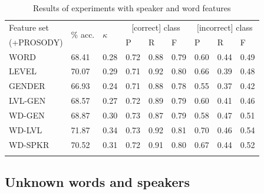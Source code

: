 		
		
		\begin{table}
			\centering
			\caption{Results of experiments with speaker and word features  }
			\begin{tabularx}{\textwidth}{lXXXXXXXX}			
			
			\toprule
			Feature set & 
			\multirow{2}{*}{\% acc.} & \multirow{2}{*}{$\kappa$} & \multicolumn{3}{c}{[correct] class} & \multicolumn{3}{c}{[incorrect] class} \\
			 \cmidrule(lr){4-6} \cmidrule(lr){7-9}
			 (+PROSODY)& & & P & R & F & P & R & F \\
			\midrule
WORD	&	68.41	&	0.28	&	0.72	&	0.88	&	0.79	&	0.60	&	0.44	&	0.49	\\
LEVEL	&	70.07	&	0.29	&	0.71	&	0.92	&	0.80	&	0.66	&	0.39	&	0.48	\\
GENDER	&	66.93	&	0.24	&	0.71	&	0.88	&	0.78	&	0.55	&	0.37	&	0.42	\\
\addlinespace
LVL-GEN	&	68.57	&	0.27	&	0.72	&	0.89	&	0.79	&	0.60	&	0.41	&	0.46	\\
WD-GEN	&	68.87	&	0.30	&	0.73	&	0.87	&	0.79	&	0.58	&	0.47	&	0.51	\\
WD-LVL	&	71.87	&	0.34	&	0.73	&	0.92	&	0.81	&	0.70	&	0.46	&	0.54	\\
\addlinespace
WD-SPKR	&	70.52	&	0.31	&	0.72	&	0.91	&	0.80	&	0.67	&	0.44	&	0.52	\\
			\bottomrule
			\label{tab:results:spkrword}
			\end{tabularx}
		\end{table}
		
	
	\subsection{Unknown words and speakers}
		
		
